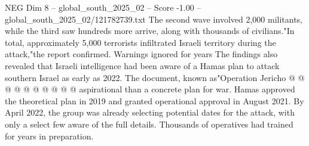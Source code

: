 \begin{textsample}{NEG Dim 8 – global\_south\_2025\_02 – Score -1.00 – global\_south\_2025\_02/121782739.txt}
The second wave involved 2,000 militants, while the third saw hundreds more arrive, along with thousands of civilians."In total, approximately 5,000 terrorists infiltrated Israeli territory during the attack,"the report confirmed.
Warnings ignored for years The findings also revealed that Israeli intelligence had been aware of a Hamas plan to attack southern Israel as early as 2022.
The document, known as"Operation Jericho @ @ @ @ @ @ @ @ @ @ aspirational than a concrete plan for war.
Hamas approved the theoretical plan in 2019 and granted operational approval in August 2021.
By April 2022, the group was already selecting potential dates for the attack, with only a select few aware of the full details.
Thousands of operatives had trained for years in preparation.

\end{textsample}

